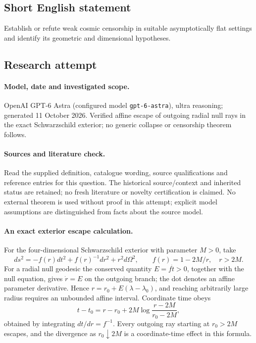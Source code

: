 \documentclass[11pt]{article}
\begin{document}
\subsection{Short English statement}
Establish or refute weak cosmic censorship in suitable asymptotically flat settings and identify its geometric and dimensional hypotheses.
\subsection{Research attempt}
\paragraph{Model, date and investigated scope.}
OpenAI GPT-6 Astra (configured model \texttt{gpt-6-astra}), ultra reasoning; generated 11 October 2026. Verified affine escape of outgoing radial null rays in the exact Schwarzschild exterior; no generic collapse or censorship theorem follows.

\paragraph{Sources and literature check.}
Read the supplied definition, catalogue wording, source qualifications and reference entries for this question. The historical source/context and inherited status are retained; no fresh literature or novelty certification is claimed. No external theorem is used without proof in this attempt; explicit model assumptions are distinguished from facts about the source model.

\paragraph{An exact exterior escape calculation.} For the four-dimensional Schwarzschild exterior with parameter \(M>0\), take
\[
 ds^2=-f(r)dt^2+f(r)^{-1}dr^2+r^2d\Omega^2,\qquad f(r)=1-2M/r,\quad r>2M.
\]
For a radial null geodesic the conserved quantity \(E=f\dot t>0\), together with the null equation, gives \(\dot r=E\) on the outgoing branch; the dot denotes an affine parameter derivative. Hence \(r=r_0+E(\lambda-\lambda_0)\), and reaching arbitrarily large radius requires an unbounded affine interval. Coordinate time obeys
\[
 t-t_0=r-r_0+2M\log\frac{r-2M}{r_0-2M},
\]
obtained by integrating \(dt/dr=f^{-1}\). Every outgoing ray starting at \(r_0>2M\) escapes, and the divergence as \(r_0\downarrow2M\) is a coordinate-time effect in this formula.
\end{document}
